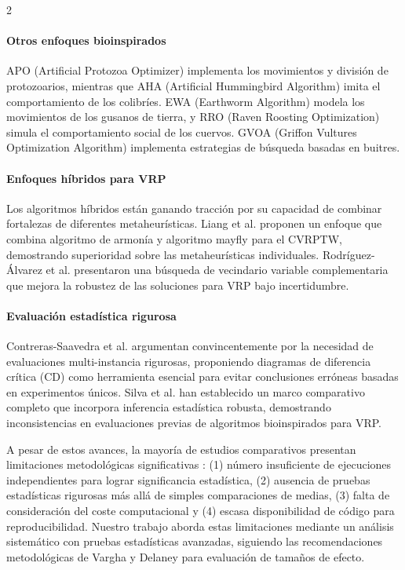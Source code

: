 \documentclass[10pt,a4paper]{extarticle}
\begin{document}
\begin{multicols}{2}
\paragraph{Otros enfoques bioinspirados} APO (Artificial Protozoa Optimizer) \cite{Wang2024APO} implementa los movimientos y división de protozoarios, mientras que AHA (Artificial Hummingbird Algorithm) \cite{Zhao2022AHA} imita el comportamiento de los colibríes. EWA (Earthworm Algorithm) \cite{Wang2018EWA} modela los movimientos de los gusanos de tierra, y RRO (Raven Roosting Optimization) \cite{Brabazon2016RRO} simula el comportamiento social de los cuervos. GVOA (Griffon Vultures Optimization Algorithm) \cite{Hasan2025GVOA} implementa estrategias de búsqueda basadas en buitres.

\paragraph{Enfoques híbridos para VRP} Los algoritmos híbridos están ganando tracción por su capacidad de combinar fortalezas de diferentes metaheurísticas. Liang et al. \cite{Liang2023HHMM} proponen un enfoque que combina algoritmo de armonía y algoritmo mayfly para el CVRPTW, demostrando superioridad sobre las metaheurísticas individuales. Rodríguez-Álvarez et al. \cite{Rodriguez2024CSVNS} presentaron una búsqueda de vecindario variable complementaria que mejora la robustez de las soluciones para VRP bajo incertidumbre.

\paragraph{Evaluación estadística rigurosa} Contreras-Saavedra et al. \cite{Contreras2024CD} argumentan convincentemente por la necesidad de evaluaciones multi-instancia rigurosas, proponiendo diagramas de diferencia crítica (CD) como herramienta esencial para evitar conclusiones erróneas basadas en experimentos únicos. Silva et al. \cite{Silva2023VRP} han establecido un marco comparativo completo que incorpora inferencia estadística robusta, demostrando inconsistencias en evaluaciones previas de algoritmos bioinspirados para VRP.

A pesar de estos avances, la mayoría de estudios comparativos presentan limitaciones metodológicas significativas \cite{Li2020SMA}: (1) número insuficiente de ejecuciones independientes para lograr significancia estadística, (2) ausencia de pruebas estadísticas rigurosas más allá de simples comparaciones de medias, (3) falta de consideración del coste computacional y (4) escasa disponibilidad de código para reproducibilidad. Nuestro trabajo aborda estas limitaciones mediante un análisis sistemático con pruebas estadísticas avanzadas, siguiendo las recomendaciones metodológicas de Vargha y Delaney \cite{Vargha2000} para evaluación de tamaños de efecto.


\end{multicols}
\end{document}
